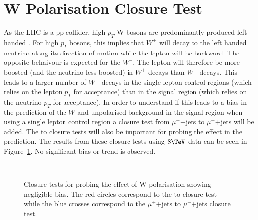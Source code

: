 \clearpage
\section{W Polarisation Closure Test\label{app:wpol}}

As the LHC is a pp collider, high $p_T$ W bosons are predominantly produced left handed \cite{WPol}.
For high $p_T$ bosons, this implies that $W^+$ will decay to the left handed neutrino along its direction of motion
while the lepton will be backward. The opposite behaivour is expected for the $W^-$. The
lepton will therefore be more boosted (and the neutrino less boosted) in $W^+$ decays than $W^-$ decays.
This leads to a larger number of $W^+$ decays in the single lepton control regions 
(which relies on the lepton $p_T$ for acceptance)
than in the signal region (which relies on the neutrino $p_T$ for acceptance). In order to understand 
if this leads to a bias in the prediction of the $W$ and unpolarised \zInv background in the signal region
when using a single lepton control region a closure test from $\mu^+$+jets to $\mu^-$+jets will be added. 
The \mj to \mmj closure tests will also be important for probing the effect in the \zInv
prediction. The results from these closure tests using $8\TeV$ data can be seen in Figure~\ref{fig:wpolCT}.
No significant bias or trend is observed.

\begin{figure}[H]
 \begin{center}  
   ~~
  \caption{Closure tests for probing the effect of W polarisation showing negligible bias. 
The red circles correspond to the \mj to \mmj closure test while the blue crosses correspond to the $\mu^+$+jets to $\mu^-$+jets closure test.}
  \label{fig:wpolCT}
 \end{center}
\end{figure}          
